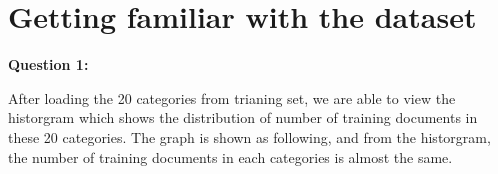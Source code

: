\documentclass[11pt]{article}
\begin{document}

\section{Getting familiar with the dataset}

\textbf{Question 1:}

After loading the 20 categories from trianing set, we are able to view the historgram which shows the distribution of number of training documents in these 20 categories. The graph is shown as following, and from the historgram, the number of training documents in each categories is almost the same.
\end{document}
